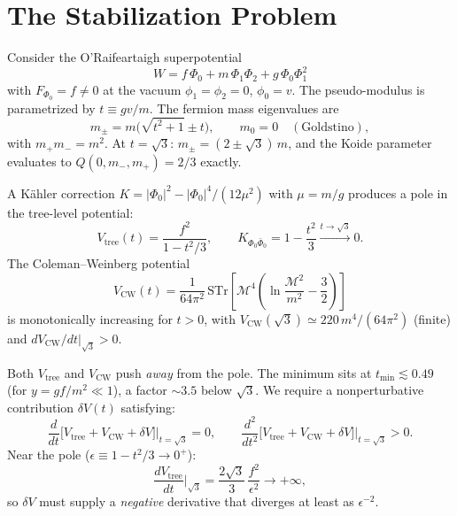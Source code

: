 
\section{The Stabilization Problem}

Consider the O'Raifeartaigh superpotential
\begin{equation}
W = f\,\Phi_0 + m\,\Phi_1\Phi_2 + g\,\Phi_0\Phi_1^2
\end{equation}
with $F_{\Phi_0} = f \neq 0$ at the vacuum $\phi_1 = \phi_2 = 0$, $\phi_0 = v$.
The pseudo-modulus is parametrized by $t \equiv gv/m$.
The fermion mass eigenvalues are
\begin{equation}
m_\pm = m\bigl(\sqrt{t^2+1} \pm t\bigr), \qquad m_0 = 0 \quad (\text{Goldstino}),
\end{equation}
with $m_+ m_- = m^2$.
At $t = \sqrt{3}$: $m_\pm = (2 \pm \sqrt{3})\,m$,
and the Koide parameter evaluates to $Q(0, m_-, m_+) = 2/3$ exactly.

A K\"ahler correction $K = |\Phi_0|^2 - |\Phi_0|^4/(12\mu^2)$
with $\mu = m/g$ produces a pole in the tree-level potential:
\begin{equation}
V_{\text{tree}}(t) = \frac{f^2}{1 - t^2/3}, \qquad
K_{\Phi_0\bar\Phi_0} = 1 - \frac{t^2}{3} \xrightarrow{t\to\sqrt{3}} 0.
\end{equation}
The Coleman--Weinberg potential
\begin{equation}
V_{\text{CW}}(t) = \frac{1}{64\pi^2}\,\text{STr}\!\left[\mathcal{M}^4\!\left(\ln\frac{\mathcal{M}^2}{m^2} - \frac{3}{2}\right)\right]
\end{equation}
is monotonically increasing for $t > 0$, with $V_{\text{CW}}(\sqrt{3}) \simeq 220\,m^4/(64\pi^2)$
(finite) and $dV_{\text{CW}}/dt|_{\sqrt{3}} > 0$.

Both $V_{\text{tree}}$ and $V_{\text{CW}}$ push \emph{away} from the pole.
The minimum sits at $t_{\min} \lesssim 0.49$ (for $y = gf/m^2 \ll 1$),
a factor $\sim 3.5$ below $\sqrt{3}$.
We require a nonperturbative contribution $\delta V(t)$ satisfying:
\begin{equation}
\frac{d}{dt}\bigl[V_{\text{tree}} + V_{\text{CW}} + \delta V\bigr]\bigg|_{t=\sqrt{3}} = 0, \qquad
\frac{d^2}{dt^2}\bigl[V_{\text{tree}} + V_{\text{CW}} + \delta V\bigr]\bigg|_{t=\sqrt{3}} > 0.
\end{equation}
Near the pole ($\epsilon \equiv 1 - t^2/3 \to 0^+$):
\begin{equation}
\frac{dV_{\text{tree}}}{dt}\bigg|_{\sqrt{3}} = \frac{2\sqrt{3}}{3}\,\frac{f^2}{\epsilon^2} \to +\infty,
\end{equation}
so $\delta V$ must supply a \emph{negative} derivative that diverges at least as $\epsilon^{-2}$.


